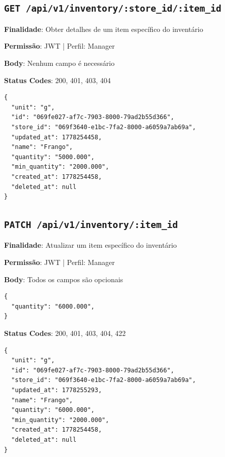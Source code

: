 \subsection{\texttt{GET /api/v1/inventory/:store\_id/:item\_id}}

\noindent\textbf{Finalidade}: Obter detalhes de um item específico do inventário

\noindent\textbf{Permissão}: JWT | Perfil: Manager

\noindent\textbf{Body}: Nenhum campo é necessário

\noindent\textbf{Status Codes}: 200, 401, 403, 404

\begin{tcolorbox}[colback=green!5, colframe=black, title=\textbf{200 OK}]
\begin{verbatim}
{
  "unit": "g",
  "id": "069fe027-af7c-7903-8000-79ad2b55d366",
  "store_id": "069f3640-e1bc-7fa2-8000-a6059a7ab69a",
  "updated_at": 1778254458,
  "name": "Frango",
  "quantity": "5000.000",
  "min_quantity": "2000.000",
  "created_at": 1778254458,
  "deleted_at": null
}
\end{verbatim}
\end{tcolorbox}

\subsection{\texttt{PATCH /api/v1/inventory/:item\_id}}

\noindent\textbf{Finalidade}: Atualizar um item específico do inventário

\noindent\textbf{Permissão}: JWT | Perfil: Manager

\noindent\textbf{Body}: Todos os campos são opcionais

\vspace{-0.2cm}

\begin{verbatim}
{
  "quantity": "6000.000",
}
\end{verbatim}

\noindent\textbf{Status Codes}: 200, 401, 403, 404, 422

\begin{tcolorbox}[colback=green!5, colframe=black, title=\textbf{200 OK}]
\begin{verbatim}
{
  "unit": "g",
  "id": "069fe027-af7c-7903-8000-79ad2b55d366",
  "store_id": "069f3640-e1bc-7fa2-8000-a6059a7ab69a",
  "updated_at": 1778255293,
  "name": "Frango",
  "quantity": "6000.000",
  "min_quantity": "2000.000",
  "created_at": 1778254458,
  "deleted_at": null
}
\end{verbatim}
\end{tcolorbox}

